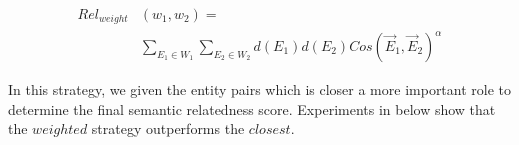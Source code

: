 \begin{small}
    \begin{equation}
        \begin{split}
        \label{cos}
        \nonumber
        Rel_{weight}&(w_1, w_2)=\\ 
        &\sum_{E_1 \in W_1}\sum_{E_2 \in W_2}d(E_1)d(E_2)Cos(\overrightarrow E_1,\overrightarrow E_2)^\alpha 
        \end{split}
    \end{equation}
\end{small}

In this strategy, we given the entity pairs which is closer a more important role to determine the final semantic relatedness
score. Experiments in below show that the $weighted$ strategy outperforms the $closest$.


